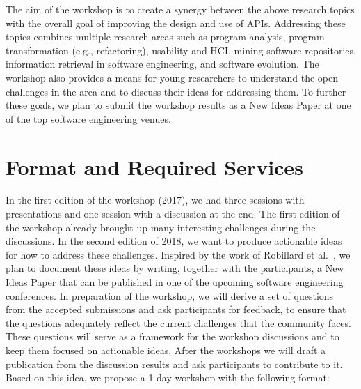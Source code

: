 \documentclass[sigconf]{acmart}
\newcommand{\updated}[1]{#1}
\begin{document}
The aim of the workshop is to create a synergy between the above research topics with the overall goal of improving the design and use of APIs. Addressing these topics combines multiple research areas such as program analysis, program transformation (e.g., refactoring), usability and HCI, mining software repositories, information retrieval in software engineering, and software evolution. The workshop also provides a means for young researchers to understand the open challenges in the area and to discuss their ideas for addressing them. \updated{To further these goals, we plan to submit the workshop results as a New Ideas Paper at one of the top software engineering venues.}

\section{Format and Required Services}

\updated{In the first edition of the workshop (2017), we had three sessions with presentations and one session with a discussion at the end. The first edition of the workshop already brought up many interesting challenges during the discussions. In the second edition of 2018, we want to produce actionable ideas for how to address these challenges. Inspired by the work of Robillard et al.~\cite{RMT+17}, we plan to document these ideas by writing, together with the participants, a New Ideas Paper that can be published in one of the upcoming software engineering conferences. In preparation of the workshop, we will derive a set of questions from the accepted submissions and ask participants for feedback, to ensure that the questions adequately reflect the current challenges that the community faces. These questions will serve as a framework for the workshop discussions and to keep them focused on actionable ideas. After the workshops we will draft a publication from the discussion results and ask participants to contribute to it.
%
Based on this idea,} we propose a 1-day workshop with the following format:
\end{document}
